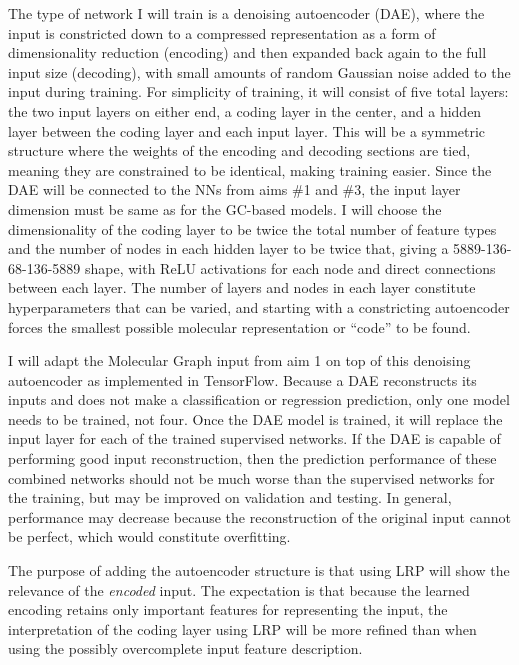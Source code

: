 \documentclass[12pt]{article}
\begin{document}
The type of network I will train is a denoising autoencoder (DAE), where the input is constricted down to a compressed representation as a form of dimensionality reduction (encoding) and then expanded back again to the full input size (decoding), with small amounts of random Gaussian noise added to the input during training. For simplicity of training, it will consist of five total layers: the two input layers on either end, a coding layer in the center, and a hidden layer between the coding layer and each input layer. This will be a symmetric structure where the weights of the encoding and decoding sections are tied, meaning they are constrained to be identical, making training easier. Since the DAE will be connected to the NNs from aims \#1 and \#3, the input layer dimension must be same as for the GC-based models. I will choose the dimensionality of the coding layer to be twice the total number of feature types and the number of nodes in each hidden layer to be twice that, giving a 5889-136-68-136-5889 shape, with ReLU activations for each node and direct connections between each layer. The number of layers and nodes in each layer constitute hyperparameters that can be varied, and starting with a constricting autoencoder forces the smallest possible molecular representation or ``code'' to be found.

I will adapt the Molecular Graph input from aim 1 on top of this denoising autoencoder as implemented in TensorFlow\cite{tensorflow2015-whitepaper,github:tf,github:tf_dae}. Because a DAE reconstructs its inputs and does not make a classification or regression prediction, only one model needs to be trained, not four. Once the DAE model is trained, it will replace the input layer for each of the trained supervised networks. If the DAE is capable of performing good input reconstruction, then the prediction performance of these combined networks should not be much worse than the supervised networks for the training, but may be improved on validation and testing. In general, performance may decrease because the reconstruction of the original input cannot be perfect, which would constitute overfitting.

The purpose of adding the autoencoder structure is that using LRP will show the relevance of the \emph{encoded} input. The expectation is that because the learned encoding retains only important features for representing the input, the interpretation of the coding layer using LRP will be more refined than when using the possibly overcomplete input feature description.
\end{document}
